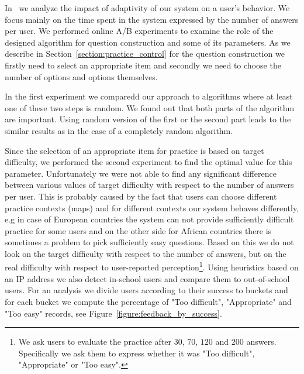 \documentclass[table,color,cover,twoside,nolot,nolof]{fithesis3/fithesis3}
\begin{document}
In~\cite{papousek2015impact} we analyze the impact of adaptivity of our system
on a user's behavior. We focus mainly on the time spent in the system expressed
by the number of answers per user. We performed online A/B experiments to examine
the role of the designed algorithm for question construction and some of its
parameters. As we describe in Section~\ref{section:practice_control} for the
question construction we firstly need to select an appropriate item and secondly
we need to choose the number of options and options themselves.

In the first experiment we comparedd our approach to algorithms where at least
one of these two steps is random. We found out that both parts of the algorithm
are important. Using random version of the first or the second part leads to
the similar results as in the case of a completely random algorithm.

Since the selection of an appropriate item for practice is based on target
difficulty, we performed the second experiment to find the optimal value for
this parameter. Unfortunately we were not able to find any significant
difference between various values of target difficulty with respect to the number
of answers per user. This is probably caused by the fact that users can choose
different practice contexts (maps) and for different contexts our system
behaves differently, e.g in case of European countries the system can not
provide sufficiently difficult practice for some users and on the other side
for African countries there is sometimes a problem to pick sufficiently easy
questions. Based on this we do not look on the target difficulty with respect to
the number of answers, but on the real difficulty with respect to user-reported
perception\footnote{We ask users to evaluate the practice after $30$, $70$,
$120$ and $200$ answers. Specifically we ask them to express whether it was "Too
difficult", "Appropriate" or "Too easy".}. Using heuristics based on an IP address
we also detect in-school users and compare them to out-of-school users. For an
analysis we divide users according to their success to buckets and for each
bucket we compute the percentage of "Too difficult", "Appropriate" and "Too
easy" records, see Figure~\ref{figure:feedback_by_success}.
\end{document}
